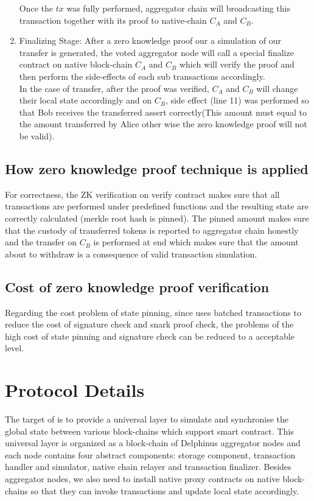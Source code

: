 \documentclass[pageno]{jpaper}
\begin{document}
\begin{enumerate}[leftmargin=*]
\newline
Once the $tx$ was fully performed, aggregator chain will broadcasting this transaction together with its proof to native-chain $C_A$ and $C_B$.\\
\item Finalizing Stage:
After a zero knowledge proof our a simulation of our transfer is generated, the voted aggregator node will call a special finalize contract on native block-chain $C_A$ and $C_B$ which will verify the proof and then perform the side-effects of each sub transactions accordingly.\\
\newline
In the case of transfer, after the proof was verified, $C_A$ and $C_B$ will change their local state accordingly and on $C_B$, side effect (line 11) was performed so that Bob receives the transferred assert correctly(This amount must equal to the amount transferred by Alice other wise the zero knowledge proof will not be valid).
\end{enumerate}
\subsection{How zero knowledge proof technique is applied}
For correctness, the ZK verification on verify contract makes sure that all transactions are performed under predefined functions and the resulting state are correctly calculated (merkle root hash is pinned). The pinned amount makes sure that the custody of transferred tokens is reported to aggregator chain honestly and the transfer on $C_B$ is performed at end which makes sure that the amount about to withdraw is a consequence of valid transaction simulation.

\subsection{Cost of zero knowledge proof verification}
Regarding the cost problem of state pinning, since \dprotocol uses batched transactions to reduce the cost of signature check and snark proof check, the problems of the high cost of state pinning and signature check can be reduced to a acceptable level.

\section{Protocol Details}
The target of \dprotocol is to provide a universal layer to simulate and synchronise the global state between various block-chains which support smart contract. This universal layer is organized as a block-chain of Delphinus aggregator nodes and each node contains four abstract components: storage component, transaction handler and simulator, native chain relayer and transaction finalizer.  Besides aggregator nodes, we also need to install native proxy contracts on native block-chains so that they can invoke transactions and update local state accordingly.
\end{document}
